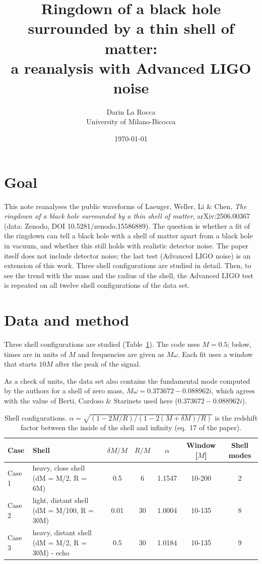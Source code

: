 \documentclass[11pt,a4paper]{article}
\title{Ringdown of a black hole surrounded by a thin shell of matter:\\ a reanalysis with Advanced LIGO noise}
\author{Darin La Rocca\\ \small University of Milano-Bicocca}
\date{\today}
\begin{document}
\maketitle

\section{Goal}
This note reanalyses the public waveforms of Laeuger, Weller, Li \& Chen, \emph{The ringdown of a black hole
surrounded by a thin shell of matter}, arXiv:2506.00367 (data: Zenodo, DOI 10.5281/zenodo.15586889).
The question is whether a fit of the ringdown can tell a black hole with a shell of matter apart from a
black hole in vacuum, and whether this still holds with realistic detector noise. The paper itself does not
include detector noise; the last test (Advanced LIGO noise) is an extension of this work.
Three shell configurations are studied in detail. Then, to see the trend with the mass and the radius of the shell,
the Advanced LIGO test is repeated on all twelve shell configurations of the data set.

\section{Data and method}
Three shell configurations are studied (Table~\ref{tab:cases}). The code uses $M=0.5$; below, times are in
units of $M$ and frequencies are given as $M\omega$. Each fit uses a window that starts $10M$ after the peak
of the signal.

As a check of units, the data set also contains the fundamental mode computed by the authors for a
shell of zero mass, $M\omega=0.373672-0.088962i$, which agrees with the value of Berti, Cardoso \&
Starinets used here ($0.373672-0.088962i$).

\begin{table}[H]
\centering\footnotesize
\begin{tabular}{llccccc}
\toprule
Case & Shell & $\delta M/M$ & $R/M$ & $\alpha$ & Window [$M$] & Shell modes \\
\midrule
Case 1 & heavy, close shell (dM = M/2, R = 6M) & 0.5 & 6 & 1.1547 & 10-200 & 2 \\
Case 2 & light, distant shell (dM = M/100, R = 30M) & 0.01 & 30 & 1.0004 & 10-135 & 8 \\
Case 3 & heavy, distant shell (dM = M/2, R = 30M) - echo & 0.5 & 30 & 1.0184 & 10-135 & 9 \\
\bottomrule
\end{tabular}
\caption{Shell configurations. $\alpha=\sqrt{(1-2M/R)/(1-2(M+\delta M)/R)}$ is the redshift factor between the inside of the shell and infinity (eq.~17 of the paper).\label{tab:cases}}
\end{table}
\end{document}
